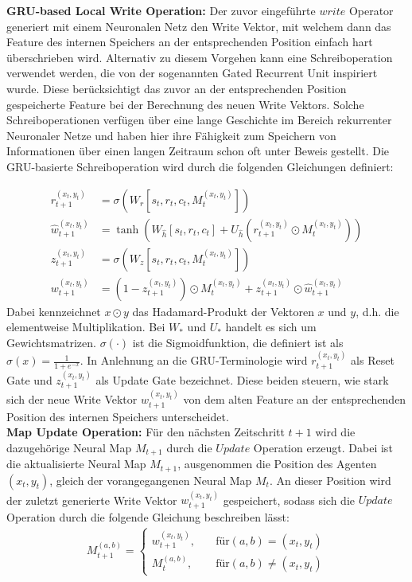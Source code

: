 \textbf{GRU-based Local Write Operation:} Der zuvor eingeführte $write$ Operator generiert mit einem Neuronalen Netz den Write Vektor, mit welchem dann das Feature des internen Speichers an der entsprechenden Position einfach hart überschrieben wird. Alternativ zu diesem Vorgehen kann eine Schreiboperation verwendet werden, die von der sogenannten Gated Recurrent Unit inspiriert wurde. Diese berücksichtigt das zuvor an der entsprechenden Position gespeicherte Feature bei der Berechnung des neuen Write Vektors. Solche Schreiboperationen verfügen über eine lange Geschichte im Bereich rekurrenter Neuronaler Netze und haben hier ihre Fähigkeit zum Speichern von Informationen über einen langen Zeitraum schon oft unter Beweis gestellt. Die GRU-basierte Schreiboperation wird durch die folgenden Gleichungen definiert:

\begin{equation*}
  \begin{align*}
    r_{t+1}^{(x_t,y_t)} &= \sigma(W_r[s_t, r_t, c_t, M_t^{(x_t,y_t)}]) \\
    \hat{w}_{t+1}^{(x_t,y_t)} &= \tanh (W_{\hat{h}}[s_t, r_t, c_t] + U_{\hat{h}}(r_{t+1}^{(x_t,y_t)} \odot M_t^{(x_t,y_t)})) \\
    z_{t+1}^{(x_t,y_t)} & = \sigma(W_z[s_t, r_t, c_t, M_t^{(x_t,y_t)}]) \\
    w_{t+1}^{(x_t,y_t)} &= (1 - z_{t+1}^{(x_t,y_t)}) \odot M_t^{(x_t,y_t)} + z_{t+1}^{(x_t,y_t)} \odot \hat{w}_{t+1}^{(x_t,y_t)}
  \end{align*}
\end{equation*}
Dabei kennzeichnet $x \odot y$ das Hadamard-Produkt der Vektoren $x$ und $y$, d.h. die elementweise Multiplikation. Bei $W_*$ und $U_*$ handelt es sich um Gewichtsmatrizen. $\sigma(\cdot)$ ist die Sigmoidfunktion, die definiert ist als $\sigma(x) = \frac{1}{1+e^{-x}}$. In Anlehnung an die GRU-Terminologie wird $r_{t+1}^{(x_t,y_t)}$ als Reset Gate und $z_{t+1}^{(x_t,y_t)}$ als Update Gate bezeichnet. Diese beiden steuern, wie stark sich der neue Write Vektor $w_{t+1}^{(x_t,y_t)}$ von dem alten Feature an der entsprechenden Position des internen Speichers unterscheidet.\\[0.1in]
\textbf{Map Update Operation:} Für den nächsten Zeitschritt $t+1$ wird die dazugehörige Neural Map $M_{t+1}$ durch die $Update$ Operation erzeugt. Dabei ist die aktualisierte Neural Map $M_{t+1}$, ausgenommen die Position des Agenten $(x_t,y_t)$, gleich der vorangegangenen Neural Map $M_t$. An dieser Position wird der zuletzt generierte Write Vektor $w_{t+1}^{(x_t,y_t)}$ gespeichert, sodass sich die $Update$ Operation durch die folgende Gleichung beschreiben lässt:
\begin{equation*}
  \begin{align*}
    M_{t+1}^{(a,b)} =
    \begin{cases}
      w_{t+1}^{(x_t,y_t)}, & \quad \text{für} (a,b) = (x_t,y_t) \\
      M_t^{(a,b)}, & \quad \text{für} (a,b) \ne (x_t,y_t)
    \end{cases}
  \end{align*}
\end{equation*}


